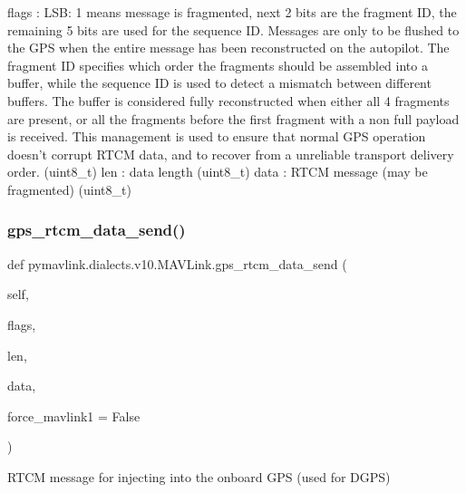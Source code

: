 \begin{DoxyVerb}
\begin{DoxyVerb}
\begin{DoxyVerb}
flags                     : LSB: 1 means message is fragmented, next 2 bits are the fragment ID, the remaining 5 bits are used for the sequence ID. Messages are only to be flushed to the GPS when the entire message has been reconstructed on the autopilot. The fragment ID specifies which order the fragments should be assembled into a buffer, while the sequence ID is used to detect a mismatch between different buffers. The buffer is considered fully reconstructed when either all 4 fragments are present, or all the fragments before the first fragment with a non full payload is received. This management is used to ensure that normal GPS operation doesn't corrupt RTCM data, and to recover from a unreliable transport delivery order. (uint8_t)
len                       : data length (uint8_t)
data                      : RTCM message (may be fragmented) (uint8_t)\end{DoxyVerb}
 \mbox{\label{classpymavlink_1_1dialects_1_1v10_1_1MAVLink_ac6a2da6afa8b009a42a3ba5cd693384d}} 
\subsubsection{\texorpdfstring{gps\+\_\+rtcm\+\_\+data\+\_\+send()}{gps\_rtcm\_data\_send()}}
{\footnotesize\ttfamily def pymavlink.\+dialects.\+v10.\+M\+A\+V\+Link.\+gps\+\_\+rtcm\+\_\+data\+\_\+send (\begin{DoxyParamCaption}\item[{}]{self,  }\item[{}]{flags,  }\item[{}]{len,  }\item[{}]{data,  }\item[{}]{force\+\_\+mavlink1 = {\ttfamily False} }\end{DoxyParamCaption})}

\begin{DoxyVerb}RTCM message for injecting into the onboard GPS (used for DGPS)


\end{DoxyVerb}
\end{DoxyVerb}
\end{DoxyVerb}
